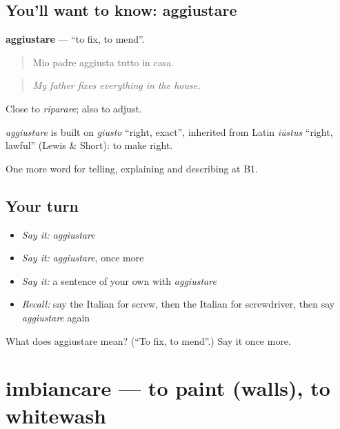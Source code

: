 \subsection*{You'll want to know: aggiustare}
\textbf{aggiustare} — \textquotedblleft{}to fix, to mend\textquotedblright{}.

\begin{quote}
Mio padre aggiusta tutto in casa.
\end{quote}

\begin{quote}
\emph{My father fixes everything in the house.}
\end{quote}

Close to \emph{riparare}; also to adjust.

\begin{cousinweb}
\emph{aggiustare} is built on \emph{giusto} \textquotedblleft{}right, exact\textquotedblright{}, inherited from Latin \emph{iūstus} \textquotedblleft{}right, lawful\textquotedblright{} (Lewis \& Short): to make right.
\end{cousinweb}

\begin{grammarlens}[title={What you've built}]
One more word for telling, explaining and describing at B1.
\end{grammarlens}

\subsection*{Your turn}
\begin{itemize}
\raggedright
  \item \emph{Say it:} \emph{aggiustare}
  \item \emph{Say it:} \emph{aggiustare}, once more
  \item \emph{Say it:} a sentence of your own with \emph{aggiustare}
  \item \emph{Recall:} say the Italian for screw, then the Italian for screwdriver, then say \emph{aggiustare} again
\end{itemize}

\begin{tcolorbox}[breakable,colback=teal!4,colframe=teal!35!black,title={Before you move on}]
What does aggiustare mean? (\textquotedblleft{}To fix, to mend\textquotedblright{}.) Say it once more.
\end{tcolorbox}
\section[imbiancare]{imbiancare — to paint (walls), to whitewash}

